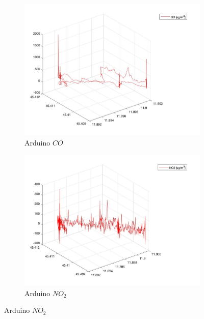 \begin{figure}
    \centering
    \begin{subfigure}[b]{0.45\textwidth}
        \centering
        \includegraphics[width=\textwidth]{images/flight-data/arduino/CO_3D.jpg}
        \caption{Arduino $CO$}
        \label{fig:CO_3D}
    \end{subfigure}
    \hfill
    \begin{subfigure}[b]{0.45\textwidth}
        \centering
        \includegraphics[width=\textwidth]{images/flight-data/arduino/NO2_3D.jpg}
        \caption{Arduino $NO_2$}
        \label{fig:NO2_3D}
    \end{subfigure}
    

\end{figure}
